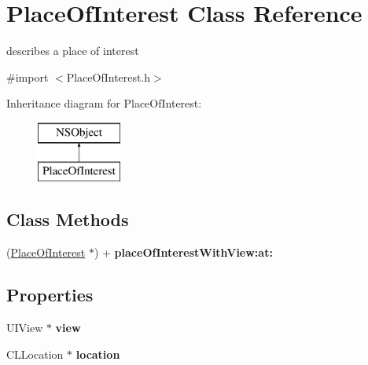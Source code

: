 \hypertarget{interface_place_of_interest}{\section{Place\-Of\-Interest Class Reference}
\label{interface_place_of_interest}
}


describes a place of interest  




{\ttfamily \#import $<$Place\-Of\-Interest.\-h$>$}

Inheritance diagram for Place\-Of\-Interest\-:\begin{figure}[H]
\begin{center}
\leavevmode
\includegraphics[height=2.000000cm]{interface_place_of_interest}
\end{center}
\end{figure}
\subsection*{Class Methods}
\begin{DoxyCompactItemize}
\item 
\hypertarget{interface_place_of_interest_a5454b3107340dc476155b035d1a359ad}{(\hyperlink{interface_place_of_interest}{Place\-Of\-Interest} $\ast$) + {\bfseries place\-Of\-Interest\-With\-View\-:at\-:}}\label{interface_place_of_interest_a5454b3107340dc476155b035d1a359ad}

\end{DoxyCompactItemize}
\subsection*{Properties}
\begin{DoxyCompactItemize}
\item 
\hypertarget{interface_place_of_interest_a00441bc5d1af6243e8592b917a67ac9d}{U\-I\-View $\ast$ {\bfseries view}}\label{interface_place_of_interest_a00441bc5d1af6243e8592b917a67ac9d}

\item 
\hypertarget{interface_place_of_interest_a25b6e20509f18042b1c91b0cd025b22b}{C\-L\-Location $\ast$ {\bfseries location}}\label{interface_place_of_interest_a25b6e20509f18042b1c91b0cd025b22b}

\end{DoxyCompactItemize}


